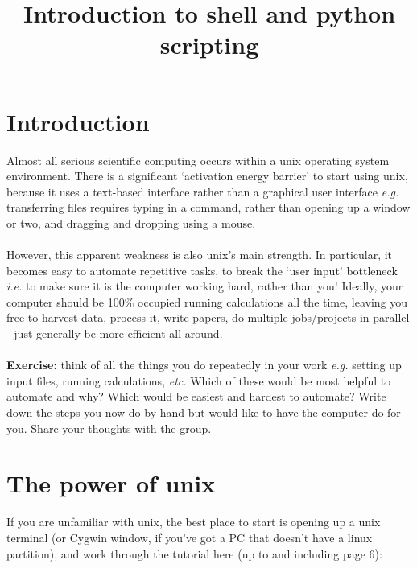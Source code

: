 \documentclass{article}
\title{Introduction to shell and python scripting}
\date{}
\begin{document}
\maketitle
\tableofcontents

\vspace{24pt}

\section{Introduction}

Almost all serious scientific computing occurs within a unix operating system environment. There is a significant `activation energy barrier' to start using unix, because it uses a text-based interface rather than a graphical user interface \textit{e.g.} transferring files requires typing in a command, rather than opening up a window or two, and dragging and dropping using a mouse.\\
\\
\noindent
However, this apparent weakness is also unix's main strength. In particular, it becomes easy to automate repetitive tasks, to break the `user input' bottleneck \textit{i.e.} to make sure it is the computer working hard, rather than you! Ideally, your computer should be 100\% occupied running calculations all the time, leaving you free to harvest data, process it, write papers, do multiple jobs/projects in parallel - just generally be more efficient all around.\\
\\
\noindent
\textbf{Exercise:} think of all the things you do repeatedly in your work \textit{e.g.} setting up input files, running calculations, \textit{etc.} Which of these would be most helpful to automate and why? Which would be easiest and hardest to automate? Write down the steps you now do by hand but would like to have the computer do for you. Share your thoughts with the group.

\clearpage

\section{The power of unix}

If you are unfamiliar with unix, the best place to start is opening up a unix terminal (or Cygwin window, if you've got a PC that doesn't have a linux partition), and work through the tutorial here (up to and including page 6):\\
\end{document}

